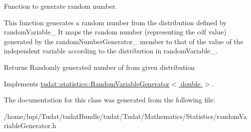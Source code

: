 Function to generate random number. 

This function generates a random number from the distribution defined by random\+Variable\+\_\+ It maps the random number (representing the cdf value) generated by the random\+Number\+Generator\+\_\+ member to that of the value of the independent variable according to the distribution in random\+Variable\+\_\+. \begin{DoxyReturn}{Returns}
Randomly generated number of from given distribution 
\end{DoxyReturn}


Implements \hyperlink{classtudat_1_1statistics_1_1RandomVariableGenerator_a8fec0a593026cd247608027404ef4438}{tudat\+::statistics\+::\+Random\+Variable\+Generator$<$ double $>$}.



The documentation for this class was generated from the following file\+:\begin{DoxyCompactItemize}
\item 
/home/lupi/\+Tudat/tudat\+Bundle/tudat/\+Tudat/\+Mathematics/\+Statistics/random\+Variable\+Generator.\+h\end{DoxyCompactItemize}
